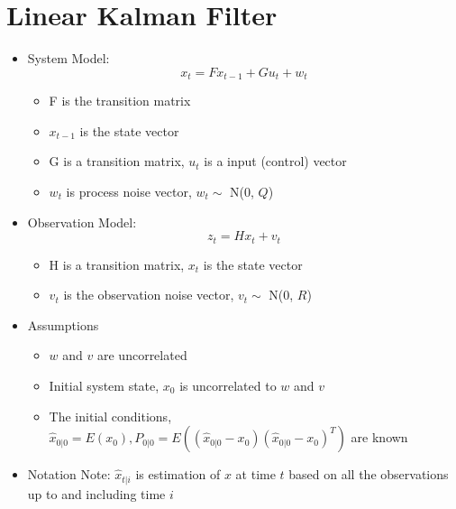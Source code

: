 \documentclass{article}
\begin{document}
\section{Linear Kalman Filter}
\begin{itemize}
\item System Model: $$x_{t} = Fx_{t-1} + Gu_t + w_t$$
\begin{itemize}
\item F is the transition matrix
\item $x_{t-1}$ is the state vector
\item G is a transition matrix, $u_t$ is a input (control) vector
\item $w_t$ is process noise vector, $w_t \sim$ N(0, $Q$)
\end{itemize}

\item Observation Model: $$z_{t} = Hx_{t} + v_t$$
\begin{itemize}
\item H is a transition matrix, $x_{t}$ is the state vector
\item $v_{t}$ is the observation noise vector, $v_t \sim$ N(0, $R$)
\end{itemize}

\item Assumptions
\begin{itemize}
\item $w$ and $v$ are uncorrelated
\item Initial system state, $x_0$ is uncorrelated to $w$ and $v$
\item The initial conditions, $\hat x _{0|0} = E(x_0), P_{0|0}=E((\hat x _{0|0}- x_0)(\hat x _{0|0}-x_0)^T)$ are known
\end{itemize}
\item Notation Note: $\hat x_{t|i}$ is estimation of $x$ at time $t$ based on all the observations up to and including time $i$
\end{itemize}
\end{document}
